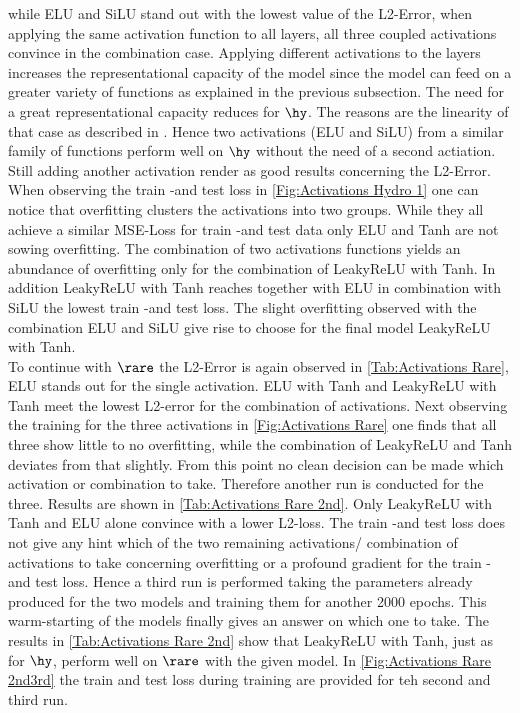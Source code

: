 while ELU and SiLU stand out with the lowest value of the L2-Error, when applying the same activation function to all layers, all three coupled activations convince in the combination case. Applying different activations to the layers increases the representational capacity of the model since the model can feed on a greater variety of functions as explained in the previous subsection. The need for a great representational capacity reduces for $\hy$. The reasons are the linearity of that case as described in \cite{BGK}. Hence two activations (ELU and SiLU) from a similar family of functions perform well on $\hy$ without the need of a second actiation. Still adding another activation render as good results concerning the L2-Error. When observing the train -and test loss in \cref{Fig:Activations Hydro 1} one can notice that overfitting clusters the activations into two groups. While they all achieve a similar MSE-Loss for train -and test data only ELU and Tanh are not sowing overfitting. The combination of two activations functions yields an abundance of overfitting only for the combination of LeakyReLU with Tanh. In addition LeakyReLU with Tanh reaches together with ELU in combination with SiLU the lowest train -and test loss. The slight overfitting observed with the combination ELU and SiLU  give rise to choose for the final model LeakyReLU with Tanh.\\
To continue with $\rare$  the L2-Error is again observed in \cref{Tab:Activations Rare}, ELU stands out for the single activation. ELU with Tanh and LeakyReLU with Tanh meet the lowest L2-error for the combination of activations. Next observing the training for the three activations in \cref{Fig:Activations Rare} one finds that all three show little to no overfitting, while the combination of LeakyReLU and Tanh deviates from that slightly. From this point no clean decision can be made which activation or combination to take. Therefore another run is conducted for the three. Results are shown in \cref{Tab:Activations Rare 2nd}. Only LeakyReLU with Tanh and ELU alone convince with a lower L2-loss. The train -and test loss does not give any hint which of the two remaining activations/ combination of activations to take concerning overfitting or a profound gradient for the train -and test loss. Hence a third run is performed taking the parameters already produced for the two models and training them for another 2000 epochs. This warm-starting of the models finally gives an answer on which one to take. The results in \cref{Tab:Activations Rare 2nd} show that LeakyReLU with Tanh, just as for $\hy$, perform well on $\rare$ with the given model. In \cref{Fig:Activations Rare 2nd3rd} the train and test loss during training are provided for teh second and third run. 

